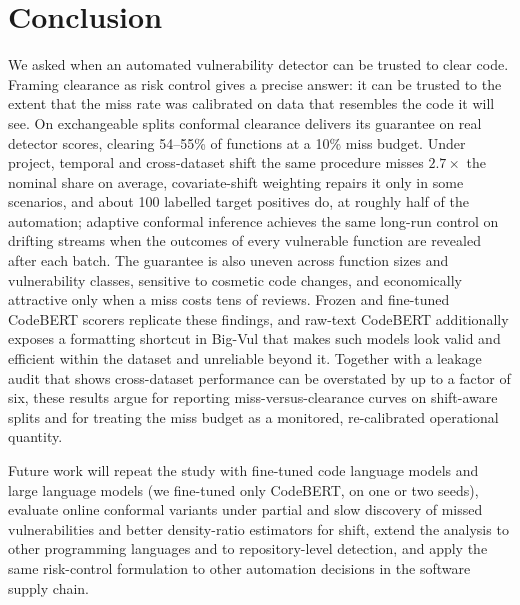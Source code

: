 \section{Conclusion}\label{sec:conclusion}
We asked when an automated vulnerability detector can be trusted to clear code. Framing clearance as risk control gives a precise answer: it can be trusted to the extent that the miss rate was calibrated on data that resembles the code it will see. On exchangeable splits conformal clearance delivers its guarantee on real detector scores, clearing 54--55\% of functions at a 10\% miss budget. Under project, temporal and cross-dataset shift the same procedure misses $2.7\times$ the nominal share on average, covariate-shift weighting repairs it only in some scenarios, and about 100 labelled target positives do, at roughly half of the automation; adaptive conformal inference achieves the same long-run control on drifting streams when the outcomes of every vulnerable function are revealed after each batch. The guarantee is also uneven across function sizes and vulnerability classes, sensitive to cosmetic code changes, and economically attractive only when a miss costs tens of reviews. Frozen and fine-tuned CodeBERT scorers replicate these findings, and raw-text CodeBERT additionally exposes a formatting shortcut in Big-Vul that makes such models look valid and efficient within the dataset and unreliable beyond it. Together with a leakage audit that shows cross-dataset performance can be overstated by up to a factor of six, these results argue for reporting miss-versus-clearance curves on shift-aware splits and for treating the miss budget as a monitored, re-calibrated operational quantity.

Future work will repeat the study with fine-tuned code language models and large language models (we fine-tuned only CodeBERT, on one or two seeds), evaluate online conformal variants under partial and slow discovery of missed vulnerabilities and better density-ratio estimators for shift, extend the analysis to other programming languages and to repository-level detection, and apply the same risk-control formulation to other automation decisions in the software supply chain.

